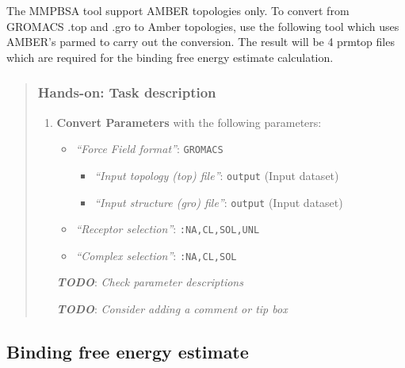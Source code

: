 \documentclass[twocolumn]{bmcart}%
\providecommand{\tightlist}{%
  \setlength{\itemsep}{0pt}\setlength{\parskip}{0pt}}
\providecommand{\tightlist}{%
  \setlength{\itemsep}{0pt}\setlength{\parskip}{0pt}}
\begin{document}
The MMPBSA tool support AMBER topologies only. To convert from GROMACS
.top and .gro to Amber topologies, use the following tool which uses
AMBER's parmed to carry out the conversion. The result will be 4 prmtop
files which are required for the binding free energy estimate
calculation.

\begin{quote}
\hypertarget{hands-on-task-description-17}{%
\subsubsection{Hands-on: Task
description}\label{hands-on-task-description-17}}

\begin{enumerate}
\def\labelenumi{\arabic{enumi}.}
\tightlist
\item
  \textbf{Convert Parameters} with the following parameters:

  \begin{itemize}
  \tightlist
  \item
    \emph{``Force Field format''}: \texttt{GROMACS}

    \begin{itemize}
    \tightlist
    \item
      \emph{``Input topology (top) file''}: \texttt{output} (Input
      dataset)
    \item
      \emph{``Input structure (gro) file''}: \texttt{output} (Input
      dataset)
    \end{itemize}
  \item
    \emph{``Receptor selection''}: \texttt{:NA,CL,SOL,UNL}
  \item
    \emph{``Complex selection''}: \texttt{:NA,CL,SOL}
  \end{itemize}

  \textbf{\emph{TODO}}: \emph{Check parameter descriptions}

  \textbf{\emph{TODO}}: \emph{Consider adding a comment or tip box}
\end{enumerate}
\end{quote}

\hypertarget{binding-free-energy-estimate}{%
\subsection{Binding free energy
estimate}\label{binding-free-energy-estimate}}
\end{document}

